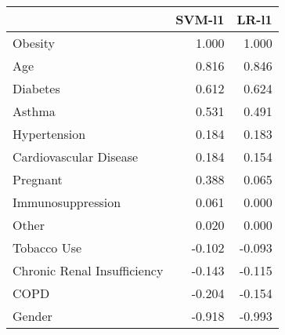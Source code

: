 \begin{tabular}{lrr}
\toprule
{} &  SVM-l1 &  LR-l1 \\
\midrule
Obesity                     &   1.000 &  1.000 \\
Age                         &   0.816 &  0.846 \\
Diabetes                    &   0.612 &  0.624 \\
Asthma                      &   0.531 &  0.491 \\
Hypertension                &   0.184 &  0.183 \\
Cardiovascular Disease      &   0.184 &  0.154 \\
Pregnant                    &   0.388 &  0.065 \\
Immunosuppression           &   0.061 &  0.000 \\
Other                       &   0.020 &  0.000 \\
Tobacco Use                 &  -0.102 & -0.093 \\
Chronic Renal Insufficiency &  -0.143 & -0.115 \\
COPD                        &  -0.204 & -0.154 \\
Gender                      &  -0.918 & -0.993 \\
\bottomrule
\end{tabular}
